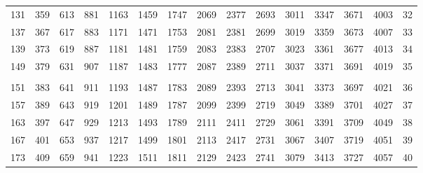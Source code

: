 \begin{tabular}{|r|r|r|r|r|r|r|r|r|r|r|r|r|r||r|}
 131 &  359 &  613 &  881 & 1163 & 1459 & 1747 & 2069 & 2377 & 2693 & 3011 & 3347 & 3671 & 4003 &   32\\
 137 &  367 &  617 &  883 & 1171 & 1471 & 1753 & 2081 & 2381 & 2699 & 3019 & 3359 & 3673 & 4007 &   33\\
 139 &  373 &  619 &  887 & 1181 & 1481 & 1759 & 2083 & 2383 & 2707 & 3023 & 3361 & 3677 & 4013 &   34\\
 149 &  379 &  631 &  907 & 1187 & 1483 & 1777 & 2087 & 2389 & 2711 & 3037 & 3371 & 3691 & 4019 &   35\\
&&&&&&&&&&&&&&\\
 151 &  383 &  641 &  911 & 1193 & 1487 & 1783 & 2089 & 2393 & 2713 & 3041 & 3373 & 3697 & 4021 &   36\\
 157 &  389 &  643 &  919 & 1201 & 1489 & 1787 & 2099 & 2399 & 2719 & 3049 & 3389 & 3701 & 4027 &   37\\
 163 &  397 &  647 &  929 & 1213 & 1493 & 1789 & 2111 & 2411 & 2729 & 3061 & 3391 & 3709 & 4049 &   38\\
 167 &  401 &  653 &  937 & 1217 & 1499 & 1801 & 2113 & 2417 & 2731 & 3067 & 3407 & 3719 & 4051 &   39\\
 173 &  409 &  659 &  941 & 1223 & 1511 & 1811 & 2129 & 2423 & 2741 & 3079 & 3413 & 3727 & 4057 &   40\\
\hline
\end{tabular}

\twocolumn

